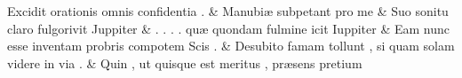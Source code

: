 \documentclass[12pt,onecolumn,twoside,a4paper]{memoir}
\begin{document}
\begin{pairs}
\begin{Leftside}
                              Excidit
                              orationis
                              omnis
                              confidentia
                              . \&
                         \stanza {}
                     Manubiæ
                              subpetant
                              pro
                              me \&
                         \stanza {}
                     Suo
                              sonitu
                              claro
                              fulgorivit
                              Juppiter \&
                         \stanza {}
                     .
                              .
                              .
                              .
                              quæ
                              quondam
                              fulmine
                              icit
                              Iuppiter \&
                         \stanza {}
                     Eam
                              nunc
                              esse
                              inventam
                              probris
                              compotem
                              Scis
                              . \&
                         \stanza {}
                     Desubito
                              famam
                              tollunt
                              ,
                              si
                              quam
                              solam
                              videre
                              in
                              via
                              . \&
                         \stanza {}
                     Quin
                              ,
                              ut
                              quisque
                              est
                              meritus
                              ,
                              præsens
                              pretium

\end{Leftside}
\end{pairs}
\end{document}
